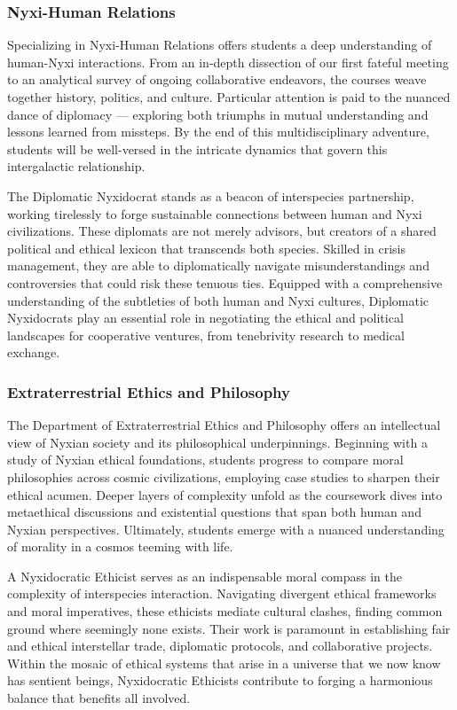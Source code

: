 \subsubsection{Nyxi-Human Relations}
Specializing in Nyxi-Human Relations offers students a deep understanding of
human-Nyxi interactions. From an in-depth dissection of our first fateful
meeting to an analytical survey of ongoing collaborative endeavors, the courses
weave together history, politics, and culture. Particular attention is paid to
the nuanced dance of diplomacy — exploring both triumphs in mutual
understanding and lessons learned from missteps. By the end of this
multidisciplinary adventure, students will be well-versed in the intricate
dynamics that govern this intergalactic relationship.

The Diplomatic Nyxidocrat stands as a beacon of interspecies partnership,
working tirelessly to forge sustainable connections between human and Nyxi
civilizations. These diplomats are not merely advisors, but creators of a
shared political and ethical lexicon that transcends both species. Skilled in
crisis management, they are able to diplomatically navigate misunderstandings
and controversies that could risk these tenuous ties. Equipped with a
comprehensive understanding of the subtleties of both human and Nyxi cultures,
Diplomatic Nyxidocrats play an essential role in negotiating the ethical and
political landscapes for cooperative ventures, from tenebrivity research to
medical exchange.

\subsubsection{Extraterrestrial Ethics and Philosophy}
The Department of Extraterrestrial Ethics and Philosophy offers an intellectual
view of Nyxian society and its philosophical underpinnings. Beginning with a
study of Nyxian ethical foundations, students progress to compare moral
philosophies across cosmic civilizations, employing case studies to sharpen
their ethical acumen. Deeper layers of complexity unfold as the coursework
dives into metaethical discussions and existential questions that span both
human and Nyxian perspectives. Ultimately, students emerge with a nuanced
understanding of morality in a cosmos teeming with life.

A Nyxidocratic Ethicist serves as an indispensable moral compass in the
complexity of interspecies interaction. Navigating divergent ethical frameworks
and moral imperatives, these ethicists mediate cultural clashes, finding common
ground where seemingly none exists. Their work is paramount in establishing
fair and ethical interstellar trade, diplomatic protocols, and collaborative
projects. Within the mosaic of ethical systems that arise in a universe that we
now know has sentient beings, Nyxidocratic Ethicists contribute to forging a
harmonious balance that benefits all involved.

